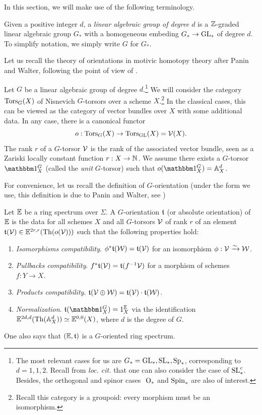 In this section, we will make use of the following terminology.

\begin{df}\label{df:graded_lin_alg_group}
Given a positive integer $d$, a \emph{linear algebraic group of degree $d$} is a $\mathbb{Z}$-graded linear algebraic group $G_*$
with a homogeneous embeding $G_* \rightarrow \mathrm{GL}_*$ of degree $d$.
To simplify notation, we simply write $G$ for $G_*$.
\end{df}

\begin{num}\label{num:lin_gps&torsors}
Let us recall the theory of orientations in motivic homotopy theory after Panin and Walter,
following the point of view of \cite[]{DF3}.

Let $G$ be a linear algebraic group of degree $d$.\footnote{The most relevant cases for us are $G_*=\mathrm{GL}_*, \mathrm{SL}_*, \mathrm{Sp}_*$,
corresponding to $d=1, 1, 2$. Recall from \emph{loc. cit.} that one can also consider
the case of $\mathrm{SL}_*^c$. Besides, the orthogonal and spinor cases $ \Orth_*$ and $\mathrm{Spin}_*$ are also of interest.}
We will consider the category $\operatorname{Tors}_G(X)$ of Nisnevich $G$-torsors over a
scheme $X$.\footnote{Recall
this category is a groupoid: every morphism must be an isomorphism.}
In the classical cases, this can be viewed as the category of vector bundles over $X$
with some additional data. In any case, there is a canonical functor
$$
o:\operatorname{Tors}_G(X) \rightarrow \operatorname{Tors}_{\mathrm{GL}}(X)=\operatorname{\mathcal V}(X).
$$
The rank $r$ of a $G$-torsor $\mathcal V$ is the rank of the associated vector bundle,
seen as a Zariski locally constant function $r:X \rightarrow \mathbb{N}$.
We assume there exists a $G$-torsor $\un^G_X$ (called the \emph{unit} $G$-torsor)
such that $o(\un^G_X)=\AA^d_X$.

For convenience, let us recall the definition of $G$-orientation (under the form we use, this definition is due to Panin and Walter,
see \cite[Def. 2.1.3]{DF3})
\end{num}
\begin{df}\label{df:G-orientation}
Let $\mathbb E$ be a ring spectrum over $\Sigma$.
A $G$-orientation $\mathfrak{t}$ (or absolute orientation) of $\mathbb E$
is the data for all schemes $X$ and all $G$-torsors $\mathcal V$ of rank $r$ of an element
$\mathfrak{t}(\mathcal V) \in \mathbb E^{2r,r}(\operatorname{Th}(o(\mathcal V)))$ such that the following properties hold:
\begin{enumerate}
\item \textit{Isomorphisms compatibility}. $\phi^*\mathfrak{t}(\mathcal W)=\mathfrak{t}(\mathcal V)$ for an isomorphism
$\phi:\mathcal V \xrightarrow \sim \mathcal W$.
\item \textit{Pullbacks compatibility}. $f^*\mathfrak{t}(\mathcal V)=\mathfrak{t}(f^{-1}\mathcal V)$ for a morphism of schemes $f:Y \rightarrow X$.
\item \textit{Products compatibility}. $\mathfrak{t}(\mathcal V \oplus \mathcal W)=\mathfrak{t}(\mathcal V) \cdot \mathfrak{t}(\mathcal W)$.
\item \textit{Normalization}. $\thom(\un_X^G)=1_X^\E$ via the identification
$\mathbb E^{2d,d}(\operatorname{Th}(\mathbb A^d_X)) \simeq \mathbb E^{0,0}(X)$, where $d$ is the degree of $G$.
\end{enumerate}
One also says that $(\mathbb E,\mathfrak{t})$ is a $G$-oriented ring spectrum.
\end{df}

